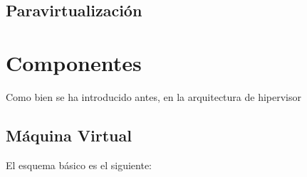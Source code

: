 \subsection{Paravirtualización}

\section{Componentes}

Como bien se ha introducido antes, en la arquitectura de hipervisor

\subsection{Máquina Virtual}
El esquema básico es el siguiente:

\begin{center}
\end{center}
